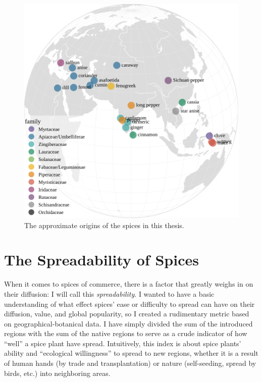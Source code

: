 \begin{figure}[ht!]
    \includegraphics[width=\linewidth]{imgs/plots/spices_map.pdf}
    \caption{The approximate origins of the spices in this thesis.}
    \label{fig:spices_map}
\end{figure}



\section{The Spreadability of Spices}

When it comes to spices of commerce, there is a factor that greatly weighs in on their diffusion: I will call this \textit{spreadability}. I wanted to have a basic understanding of what effect spices' ease or difficulty to spread can have on their diffusion, value, and global popularity, so I created a rudimentary metric based on geographical-botanical data. I have simply divided the sum of the introduced regions with the sum of the native regions to serve as a crude indicator of how ``well'' a spice plant have spread. Intuitively, this index is about spice plants' ability and ``ecological willingness'' to spread to new regions, whether it is a result of human hands (by trade and transplantation) or nature (self-seeding, spread by birds, etc.) into neighboring areas. 


